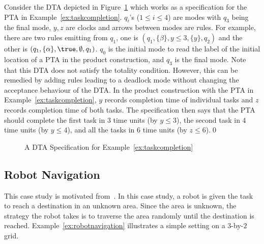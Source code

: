 \begin{example}\label{ex:taskcompletiondta}
Consider the DTA depicted in Figure~\ref{fig:dtataskcompletion} which works as a specification for the PTA in Example~\ref{ex:taskcompletion}.
$q_i$'s ($1\le i\le 4$) are modes with $q_3$ being the final mode, $y,z$ are clocks and arrows between modes are rules.
For example, there are two rules emitting from $q_1$, one is $(q_1, \{\beta\}, y\le 3, \{y\}, q_2)$ and the other is
$(q_1, \{\alpha\}, \true,\emptyset, q_1)$.
$q_0$ is the initial mode to read the label of the initial location of a PTA in the product construction, and
$q_3$ is the final mode.
Note that this DTA does not satisfy the totality condition. However, this can be remedied by adding rules leading to a deadlock mode without changing the acceptance behaviour of the DTA.
In the product construction with the PTA in Example~\ref{ex:taskcompletion}, $y$ records completion time of individual tasks and $z$ records completion time of both tasks.
The specification then says that the PTA should complete the first task in $3$ time units (by $y\le 3$), the second task in $4$ time units (by $y\le 4$), and all the tasks in $6$ time units (by $z\le 6$).\qed
\end{example}

\begin{figure}
\centering
{}
\caption{A DTA Specification for Example~\ref{ex:taskcompletion}}
\label{fig:dtataskcompletion}
\end{figure}
\subsection{Robot Navigation}
This case study is motivated from~\cite{DBLP:conf/tacas/BarbotCHKM11}.
In this case study, a robot is given the task to reach a destination in an unknown area.
Since the area is unknown,
the strategy the robot takes is to traverse the area randomly until the destination is reached.
Example~\ref{ex:robotnavigation} illustrates a simple setting on a $3$-by-$2$ grid.



